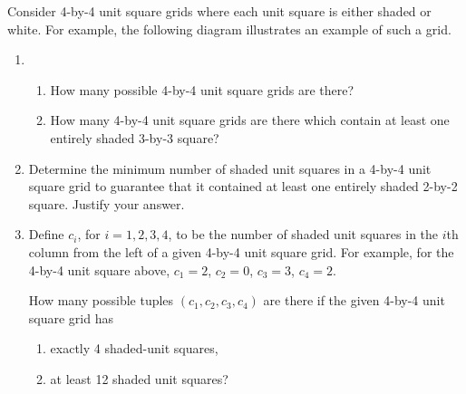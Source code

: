 \clearpage
\begin{problem}
    Consider 4-by-4 unit square grids where each unit square is either shaded or white. For example, the following diagram illustrates an example of such a grid.

    \begin{center}
    \end{center}

    \begin{enumerate}
        \item \begin{enumerate}
            \item How many possible 4-by-4 unit square grids are there?
            \item How many 4-by-4 unit square grids are there which contain at least one entirely shaded 3-by-3 square?
        \end{enumerate}
        \item Determine the minimum number of shaded unit squares in a 4-by-4 unit square grid to guarantee that it contained at least one entirely shaded 2-by-2 square. Justify your answer.
        \item Define $c_i$, for $i = 1, 2, 3, 4$, to be the number of shaded unit squares in the $i$th column from the left of a given 4-by-4 unit square grid. For example, for the 4-by-4 unit square above, $c_1 = 2$, $c_2 = 0$, $c_3 = 3$, $c_4 = 2$.
        
        How many possible tuples $(c_1, c_2, c_3, c_4)$ are there if the given 4-by-4 unit square grid has
        \begin{enumerate}
            \item exactly 4 shaded-unit squares,
            \item at least 12 shaded unit squares?
        \end{enumerate}
    \end{enumerate}
\end{problem}
